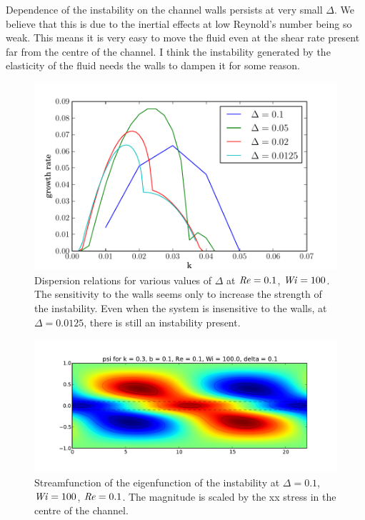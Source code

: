 \documentclass{jfm}
\newcommand\Wi{\mbox{\textit{Wi}}}
\newcommand\Rey{\mbox{\textit{Re}}}  %
\begin{document}
Dependence of the instability on the channel walls persists at very small
$\Delta$. We believe that this is due to the inertial effects at low Reynold's
number being so weak. This means it is very easy to move the fluid even at
the shear rate present far from the centre of the channel. I think the
instability generated by the elasticity of the fluid needs the walls to dampen
it for some reason. 

\begin{figure}
    \centering
    \includegraphics[width=\textwidth]{KH_vary_delta}
    \caption{
    Dispersion relations for various values of $\Delta$ at $\Rey = 0.1$, $\Wi =
    100$. The sensitivity to the walls seems only to increase the strength of
    the instability. Even when the system is insensitive to the walls, at
    $\Delta= 0.0125$, there is still an instability present.
    }
    \label{fig:walls_dependence}
\end{figure}

\begin{figure}
    \centering
    \includegraphics[width=\textwidth]{psi_high_delta}
    \caption{
    Streamfunction of the eigenfunction of the instability at $\Delta = 0.1$,
    $\Wi = 100$, $\Rey=0.1$. The magnitude is scaled by the xx stress in the
    centre of the channel.
    }
    \label{fig:psi_high_delta}
\end{figure}
\end{document}
